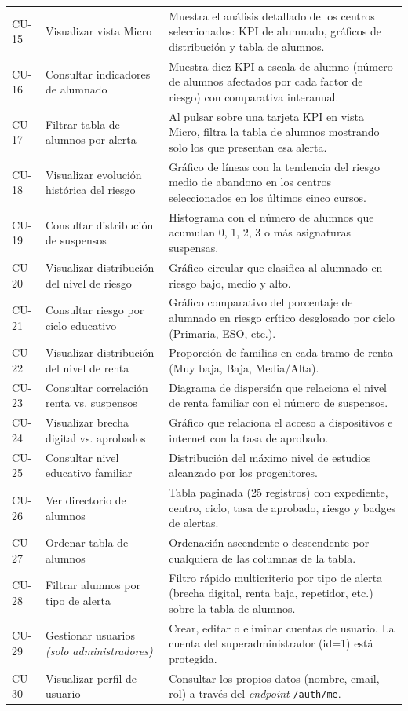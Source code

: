 \begin{longtable}{>{\raggedright\arraybackslash}p{1.5cm} 
                   >{\raggedright\arraybackslash}p{3.5cm} 
                   >{\raggedright\arraybackslash}p{7.0cm}}
\hline
CU-15 & Visualizar vista Micro & Muestra el análisis detallado de los centros seleccionados: KPI de alumnado, gráficos de distribución y tabla de alumnos. \\
CU-16 & Consultar indicadores de alumnado & Muestra diez KPI a escala de alumno (número de alumnos afectados por cada factor de riesgo) con comparativa interanual. \\
CU-17 & Filtrar tabla de alumnos por alerta & Al pulsar sobre una tarjeta KPI en vista Micro, filtra la tabla de alumnos mostrando solo los que presentan esa alerta. \\
CU-18 & Visualizar evolución histórica del riesgo & Gráfico de líneas con la tendencia del riesgo medio de abandono en los centros seleccionados en los últimos cinco cursos. \\
CU-19 & Consultar distribución de suspensos & Histograma con el número de alumnos que acumulan 0, 1, 2, 3 o más asignaturas suspensas. \\
CU-20 & Visualizar distribución del nivel de riesgo & Gráfico circular que clasifica al alumnado en riesgo bajo, medio y alto. \\
CU-21 & Consultar riesgo por ciclo educativo & Gráfico comparativo del porcentaje de alumnado en riesgo crítico desglosado por ciclo (Primaria, ESO, etc.). \\
CU-22 & Visualizar distribución del nivel de renta & Proporción de familias en cada tramo de renta (Muy baja, Baja, Media/Alta). \\
CU-23 & Consultar correlación renta vs. suspensos & Diagrama de dispersión que relaciona el nivel de renta familiar con el número de suspensos. \\
CU-24 & Visualizar brecha digital vs. aprobados & Gráfico que relaciona el acceso a dispositivos e internet con la tasa de aprobado. \\
CU-25 & Consultar nivel educativo familiar & Distribución del máximo nivel de estudios alcanzado por los progenitores. \\
CU-26 & Ver directorio de alumnos & Tabla paginada (25 registros) con expediente, centro, ciclo, tasa de aprobado, riesgo y badges de alertas. \\
CU-27 & Ordenar tabla de alumnos & Ordenación ascendente o descendente por cualquiera de las columnas de la tabla. \\
CU-28 & Filtrar alumnos por tipo de alerta & Filtro rápido multicriterio por tipo de alerta (brecha digital, renta baja, repetidor, etc.) sobre la tabla de alumnos. \\
\hline
CU-29 & Gestionar usuarios \textit{(solo administradores)} & Crear, editar o eliminar cuentas de usuario. La cuenta del superadministrador (id=1) está protegida. \\
CU-30 & Visualizar perfil de usuario & Consultar los propios datos (nombre, email, rol) a través del \textit{endpoint} \texttt{/auth/me}. \\


\end{longtable}
